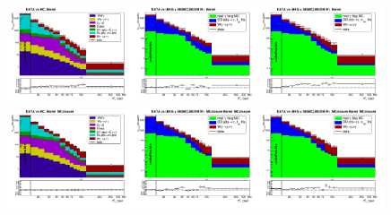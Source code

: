 \begin{figure}[htb]
  \begin{center}
   \includegraphics[width=0.33\textwidth]{../figs/figs_v11/MUON_WGamma/PrepareYields/c_TotalDATAvsMC_Barrel__phoEt.png}\includegraphics[width=0.33\textwidth]{../figs/figs_v11/MUON_WGamma/PrepareYields/c_DATAvsBkgPlusSigMCc_MUON_WGamma_TEMPL_CHISO_UNblind__Barrel__phoEt.png}\includegraphics[width=0.33\textwidth]{../figs/figs_v11/MUON_WGamma/PrepareYields/c_DATAvsBkgPlusSigMCc_MUON_WGamma_TEMPL_SIHIH_UNblind__Barrel__phoEt.png}
   \includegraphics[width=0.33\textwidth]{../figs/figs_v11/MUON_WGamma/PrepareYields/c_TotalDATAvsMC_Barrel__phoEt_MCclosure.png}\includegraphics[width=0.33\textwidth]{../figs/figs_v11/MUON_WGamma/PrepareYields/c_DATAvsBkgPlusSigMCc_MUON_WGamma_TEMPL_CHISO_UNblind_MCclosure__Barrel__phoEt_MCclosure.png}\includegraphics[width=0.33\textwidth]{../figs/figs_v11/MUON_WGamma/PrepareYields/c_DATAvsBkgPlusSigMCc_MUON_WGamma_TEMPL_SIHIH_UNblind_MCclosure__Barrel__phoEt_MCclosure.png}

\end{center}
\end{figure}
